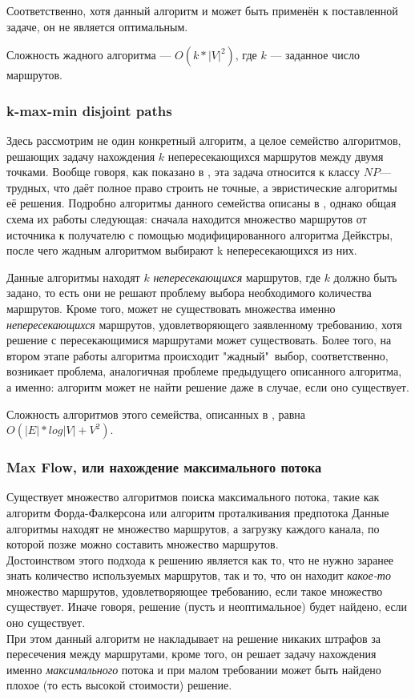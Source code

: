 \documentclass[a4paper]{article}
\begin{document}
Соответственно, хотя данный алгоритм и может быть применён к поставленной задаче, он не является оптимальным.

Сложность жадного алгоритма --- $O(k*|V|^2)$, где $k$ --- заданное число маршрутов.

\subsubsection{k-max-min disjoint paths}
Здесь рассмотрим не один конкретный алгоритм, а целое семейство алгоритмов, решающих задачу нахождения $k$ непересекающихся маршрутов между двумя точками. 
Вообще говоря, как показано в \cite{kmaxmin1}, эта задача относится к классу $NP$---трудных, что даёт полное право строить не точные, а эвристические алгоритмы её решения. 
Подробно алгоритмы данного семейства описаны в \cite{kmaxmin1, kmaxmin2, disjntNPC}, однако общая схема их работы следующая: сначала находится множество маршрутов от источника к получателю с помощью модифицированного алгоритма Дейкстры, после чего жадным алгоритмом выбирают k непересекающихся из них.

Данные алгоритмы находят $k$ \textit{непересекающихся} маршрутов, где $k$ должно быть задано, то есть они не решают проблему выбора необходимого количества маршрутов. Кроме того, может не существовать множества именно \textit{непересекающихся} маршрутов, удовлетворяющего заявленному требованию, хотя решение с пересекающимися маршрутами может существовать. Более того, на втором этапе работы алгоритма происходит "жадный"\  выбор, соответственно, возникает проблема, аналогичная проблеме предыдущего описанного алгоритма, а именно: алгоритм может не найти решение даже в случае, если оно существует.

Сложность алгоритмов этого семейства, описанных в \cite{kmaxmin1, kmaxmin2}, равна  $O(|E|*log|V| + V^2)$.

\subsubsection{Max Flow, или нахождение максимального потока}
Существует множество алгоритмов поиска максимального потока, такие как алгоритм Форда-Фалкерсона\cite{fordfson} или алгоритм проталкивания предпотока\cite{prepush}
Данные алгоритмы находят не множество маршрутов, а загрузку каждого канала, по которой позже можно составить множество маршрутов.\\ Достоинством этого подхода к решению является как то, что не нужно заранее знать количество используемых маршрутов, так и то, что он находит \textit{какое-то} множество маршрутов, удовлетворяющее требованию, если такое множество существует. Иначе говоря, решение (пусть и неоптимальное) будет найдено, если оно существует.\\
При этом данный алгоритм не накладывает на решение никаких штрафов за пересечения между маршрутами, кроме того, он решает задачу нахождения именно \textit{максимального} потока и при малом требовании может быть найдено плохое (то есть высокой стоимости) решение.
\end{document}
